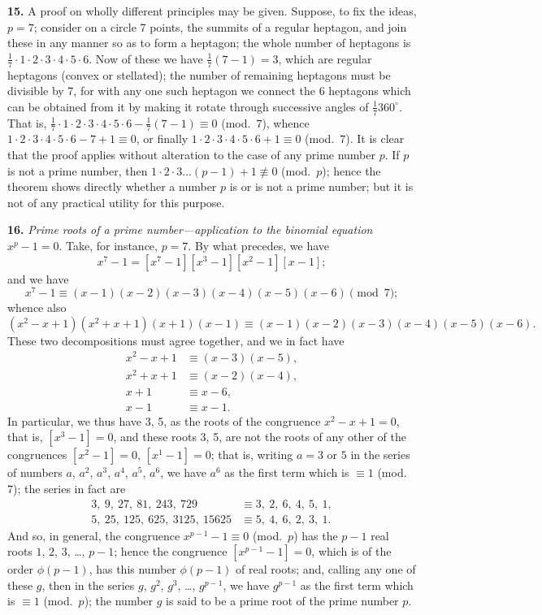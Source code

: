 \documentclass[11pt,a4paper]{book}
\begin{document}
\textbf{15.}\quad
A proof on wholly different principles may be given. Suppose, to fix the ideas, $p = 7$; consider on a circle 7 points, the summits of a regular heptagon, and join these in any manner so as to form a heptagon; the whole number of heptagons is $\frac{1}{7} \cdot 1 \cdot 2 \cdot 3 \cdot 4 \cdot 5 \cdot 6$. Now of these we have $\frac{1}{7}(7 - 1) = 3$, which are regular heptagons (convex or stellated); the number of remaining heptagons must be divisible by 7, for with any one such heptagon we connect the 6 heptagons which can be obtained from it by making it rotate through successive angles of $\frac{1}{7}360^{\circ}$. That is, $\frac{1}{7} \cdot 1 \cdot 2 \cdot 3 \cdot 4 \cdot 5 \cdot 6 - \frac{1}{7}(7 - 1) \equiv 0$ (mod.\ $7$), whence $1 \cdot 2 \cdot 3 \cdot 4 \cdot 5 \cdot 6 - 7 + 1 \equiv 0$, or finally $1 \cdot 2 \cdot 3 \cdot 4 \cdot 5 \cdot 6 + 1 \equiv 0$ (mod.\ $7$). It is clear that the proof applies without alteration to the case of any prime number $p$. If $p$ is not a prime number, then $1 \cdot 2 \cdot 3 \ldots (p - 1) + 1 \not\equiv 0$ (mod.\ $p$); hence the theorem shows directly whether a number $p$ is or is not a prime number; but it is not of any practical utility for this purpose.

\textbf{16.}\quad
\textit{Prime roots of a prime number---application to the binomial equation} $x^{p} - 1 = 0$. Take, for instance, $p = 7$. By what precedes, we have
\[
x^{7} - 1 = [x^{7} - 1][x^{3} - 1][x^{2} - 1][x - 1];
\]
and we have
\[
x^{7} - 1 \equiv (x - 1)(x - 2)(x - 3)(x - 4)(x - 5)(x - 6) \pmod{7};
\]
whence also
\[
(x^{2} - x + 1)(x^{2} + x + 1)(x + 1)(x - 1) \equiv (x - 1)(x - 2)(x - 3)(x - 4)(x - 5)(x - 6).
\]
These two decompositions must agree together, and we in fact have
\begin{align*}
x^{2} - x + 1 &\equiv (x - 3)(x - 5),\\
x^{2} + x + 1 &\equiv (x - 2)(x - 4),\\
x + 1 &\equiv x - 6,\\
x - 1 &\equiv x - 1.
\end{align*}
In particular, we thus have 3, 5, as the roots of the congruence $x^{2} - x + 1 = 0$, that is, $[x^{3} - 1] = 0$, and these roots 3, 5, are not the roots of any other of the congruences $[x^{2} - 1] = 0$, $[x^{1} - 1] = 0$; that is, writing $a = 3$ or $5$ in the series of numbers $a$, $a^{2}$, $a^{3}$, $a^{4}$, $a^{5}$, $a^{6}$, we have $a^{6}$ as the first term which is $\equiv 1$ (mod.\ $7$); the series in fact are
\begin{align*}
3,\ 9,\ 27,\ 81,\ 243,\ 729 &\equiv 3,\ 2,\ 6,\ 4,\ 5,\ 1,\\
5,\ 25,\ 125,\ 625,\ 3125,\ 15625 &\equiv 5,\ 4,\ 6,\ 2,\ 3,\ 1.
\end{align*}
And so, in general, the congruence $x^{p-1} - 1 \equiv 0$ (mod.\ $p$) has the $p - 1$ real roots $1$, $2$, $3$, \ldots, $p - 1$; hence the congruence $[x^{p-1} - 1] = 0$, which is of the order $\phi(p - 1)$, has this number $\phi(p - 1)$ of real roots; and, calling any one of these $g$, then in the series $g$, $g^{2}$, $g^{3}$, \ldots, $g^{p-1}$, we have $g^{p-1}$ as the first term which is $\equiv 1$ (mod.\ $p$); the number $g$ is said to be a prime root of the prime number $p$.
\end{document}
